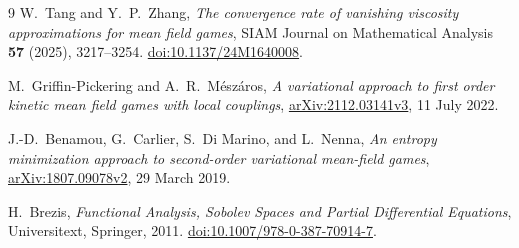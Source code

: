 \documentclass[11pt]{article}
\begin{document}
\begin{thebibliography}{9}
W.~Tang and Y.~P.~Zhang,
\emph{The convergence rate of vanishing viscosity approximations for
mean field games},
SIAM Journal on Mathematical Analysis \textbf{57} (2025), 3217--3254.
\href{https://doi.org/10.1137/24M1640008}{doi:10.1137/24M1640008}.

M.~Griffin-Pickering and A.~R.~M\'esz\'aros,
\emph{A variational approach to first order kinetic mean field games
with local couplings},
\href{https://arxiv.org/abs/2112.03141v3}{arXiv:2112.03141v3},
11 July 2022.

J.-D.~Benamou, G.~Carlier, S.~Di Marino, and L.~Nenna,
\emph{An entropy minimization approach to second-order variational
mean-field games},
\href{https://arxiv.org/abs/1807.09078v2}{arXiv:1807.09078v2},
29 March 2019.

H.~Brezis,
\emph{Functional Analysis, Sobolev Spaces and Partial Differential Equations},
Universitext, Springer, 2011.
\href{https://doi.org/10.1007/978-0-387-70914-7}
{doi:10.1007/978-0-387-70914-7}.
\end{thebibliography}
\end{document}
